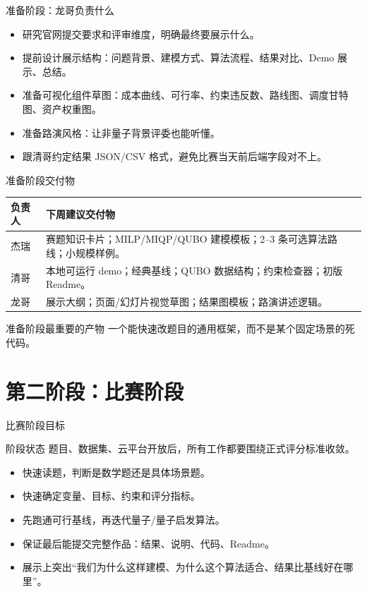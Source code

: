 \documentclass[aspectratio=169]{beamer}
\begin{document}
\begin{frame}{准备阶段：龙哥负责什么}
\small
\begin{itemize}
  \item 研究官网提交要求和评审维度，明确最终要展示什么。
  \item 提前设计展示结构：问题背景、建模方式、算法流程、结果对比、Demo 展示、总结。
  \item 准备可视化组件草图：成本曲线、可行率、约束违反数、路线图、调度甘特图、资产权重图。
  \item 准备路演风格：让非量子背景评委也能听懂。
  \item 跟清哥约定结果 JSON/CSV 格式，避免比赛当天前后端字段对不上。
\end{itemize}
\end{frame}

\begin{frame}{准备阶段交付物}
\small
\centering
\setlength{\tabcolsep}{4pt}
\begin{tabular}{p{2.2cm} p{8.2cm}}
\toprule
负责人 & 下周建议交付物 \\
\midrule
杰瑞 & 赛题知识卡片；MILP/MIQP/QUBO 建模模板；2--3 条可选算法路线；小规模样例。 \\
清哥 & 本地可运行 demo；经典基线；QUBO 数据结构；约束检查器；初版 Readme。 \\
龙哥 & 展示大纲；页面/幻灯片视觉草图；结果图模板；路演讲述逻辑。 \\
\bottomrule
\end{tabular}

\vspace{0.7em}
\begin{block}{准备阶段最重要的产物}
  一个能快速改题目的通用框架，而不是某个固定场景的死代码。
\end{block}
\end{frame}

\section{第二阶段：比赛阶段}

\begin{frame}{比赛阶段目标}
\small
\begin{block}{阶段状态}
  题目、数据集、云平台开放后，所有工作都要围绕正式评分标准收敛。
\end{block}

\begin{itemize}
  \item 快速读题，判断是数学题还是具体场景题。
  \item 快速确定变量、目标、约束和评分指标。
  \item 先跑通可行基线，再迭代量子/量子启发算法。
  \item 保证最后能提交完整作品：结果、说明、代码、Readme。
  \item 展示上突出“我们为什么这样建模、为什么这个算法适合、结果比基线好在哪里”。
\end{itemize}
\end{frame}
\end{document}
